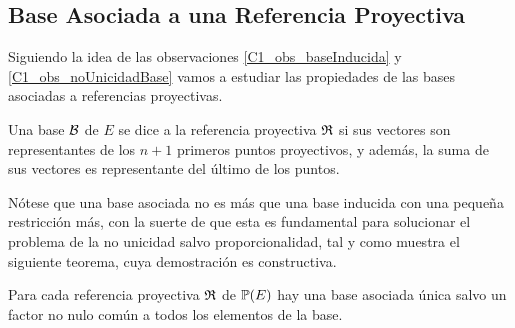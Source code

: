 \subsection{Base Asociada a una Referencia Proyectiva}
Siguiendo la idea de las observaciones \ref{C1_obs_baseInducida} y \ref{C1_obs_noUnicidadBase} vamos a estudiar las propiedades de las bases asociadas a referencias proyectivas.
\begin{defi}
	\label{C1_def_baseAsociada}
	Una base $\mathcal{B}$ de $E$ se dice  a la referencia proyectiva $\mathfrak{R}$ si sus vectores son representantes de los $n+1$ primeros puntos proyectivos, y además, la suma de sus vectores es representante del último de los puntos.
\end{defi}
Nótese que una base asociada no es más que una base inducida con una pequeña restricción más, con la suerte de que esta es fundamental para solucionar el problema de la no unicidad salvo proporcionalidad, tal y como muestra el siguiente teorema, cuya demostración es constructiva.
\begin{theo}
	\label{C1_teo_unicidadBase}
	Para cada referencia proyectiva $\mathfrak{R}$ de $\mathbb{P}(E)$ hay una base asociada única salvo un factor no nulo común a todos los elementos de la base.
\end{theo}
